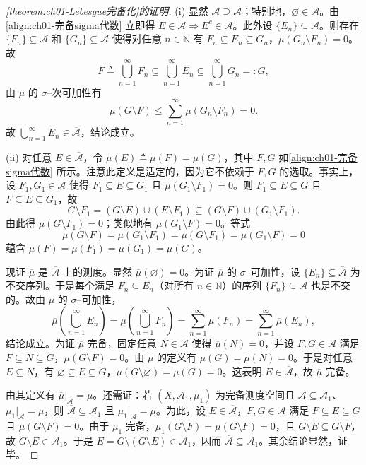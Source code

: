 \documentclass[../../main.tex]{subfiles}%
\begin{document}
\begin{proof}[\cref{theorem:ch01-Lebesgue完备化}的证明]
(i) 显然 $\overline{\mathcal{A}}\supseteq\mathcal{A}$；特别地，$\varnothing \in\overline{\mathcal{A}}$。由\eqref{align:ch01-完备sigma代数} 立即得 $E\in\overline{\mathcal{A}}\Rightarrow E^c\in\overline{\mathcal{A}}$。此外设 $\{E_n\}\subseteq\overline{\mathcal{A}}$。则存在 $\{F_n\}\subseteq\mathcal{A}$ 和 $\{G_n\}\subseteq\mathcal{A}$ 使得对任意 $n\in\mathbb{N}$ 有 $F_n\subseteq E_n\subseteq G_n$，$\mu(G_n\setminus F_n)=0$。故
\[
F\triangleq \bigcup_{n=1}^\infty F_n\subseteq\bigcup_{n=1}^\infty E_n\subseteq\bigcup_{n=1}^\infty G_n=:G,
\]
由 $\mu$ 的 $\sigma$--次可加性有
\[
\mu(G\setminus F)\leqslant\sum_{n=1}^\infty\mu(G_n\setminus F_n)=0.
\]
故 $\bigcup_{n=1}^\infty E_n\in\overline{\mathcal{A}}$，结论成立。

(ii) 对任意 $E\in\overline{\mathcal{A}}$，令 $\overline{\mu}(E)\triangleq \mu(F)=\mu(G)$，其中 $F,G$ 如\eqref{align:ch01-完备sigma代数} 所示。注意此定义是适定的，因为它不依赖于 $F,G$ 的选取。事实上，设 $F_1,G_1\in\mathcal{A}$ 使得 $F_1\subseteq E\subseteq G_1$ 且 $\mu(G_1\setminus F_1)=0$。则 $F_1\subseteq E\subseteq G$ 且 $F\subseteq E\subseteq G_1$，故
\[
G\setminus F_1=(G\setminus E)\cup(E\setminus F_1)\subseteq(G\setminus F)\cup(G_1\setminus F_1).
\]
由此得 $\mu(G\setminus F_1)=0$；类似地有 $\mu(G_1\setminus F)=0$。等式
\[
\mu(G\setminus F)=\mu(G_1\setminus F_1)=\mu(G\setminus F_1)=\mu(G_1\setminus F)=0
\]
蕴含 $\mu(F)=\mu(F_1)=\mu(G_1)=\mu(G)$。

现证 $\overline{\mu}$ 是 $\overline{\mathcal{A}}$ 上的测度。显然 $\overline{\mu}(\varnothing )=0$。为证 $\overline{\mu}$ 的 $\sigma$--可加性，设 $\{E_n\}\subseteq\overline{\mathcal{A}}$ 为不交序列。于是每个满足 $F_n\subseteq E_n$（对所有 $n\in\mathbb{N}$）的序列 $\{F_n\}\subseteq\mathcal{A}$ 也是不交的。故由 $\mu$ 的 $\sigma$--可加性，
\[
\overline{\mu}\left(\bigcup_{n=1}^\infty E_n\right)=\mu\left(\bigcup_{n=1}^\infty F_n\right)=\sum_{n=1}^\infty\mu(F_n)=\sum_{n=1}^\infty\overline{\mu}(E_n),
\]
结论成立。为证 $\overline{\mu}$ 完备，固定任意 $N\in\overline{\mathcal{A}}$ 使得 $\overline{\mu}(N)=0$，并设 $F,G\in\mathcal{A}$ 满足 $F\subseteq N\subseteq G$，$\mu(G\setminus F)=0$。由 $\overline{\mu}$ 的定义有 $\mu(G)=\overline{\mu}(N)=0$。于是对任意 $E\subseteq N$，有 $\varnothing \subseteq E\subseteq G$，$\mu(G\setminus\varnothing )=\mu(G)=0$。这表明 $E\in\overline{\mathcal{A}}$，故 $\overline{\mu}$ 完备。

由其定义有 $\overline{\mu}|_{\mathcal{A}}=\mu$。还需证：若 $(X,\mathcal{A}_1,\mu_1)$ 为完备测度空间且 $\mathcal{A}\subseteq\mathcal{A}_1$、$\mu_1|_{\mathcal{A}}=\mu$，则 $\overline{\mathcal{A}}\subseteq\mathcal{A}_1$ 且 $\mu_1|_{\overline{\mathcal{A}}}=\overline{\mu}$。为此，设 $E\in\overline{\mathcal{A}}$，$F,G\in\mathcal{A}$ 满足 $F\subseteq E\subseteq G$ 且 $\mu(G\setminus F)=0$。由于 $\mu_1$ 完备，$\mu_1(G\setminus F)=\mu(G\setminus F)=0$，且 $G\setminus E\subseteq G\setminus F$，故 $G\setminus E\in\mathcal{A}_1$。于是 $E=G\setminus(G\setminus E)\in\mathcal{A}_1$，因而 $\overline{\mathcal{A}}\subseteq\mathcal{A}_1$。其余结论显然，证毕。
\end{proof}
\end{document}
